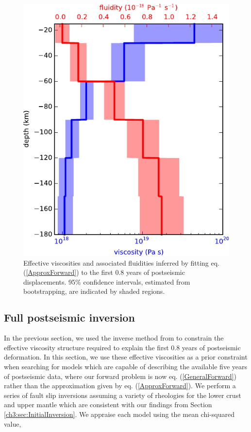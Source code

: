 \begin{figure}
\includegraphics[scale=1.0]{ch3/figures/2016jb013114-p12}
\centering 
\caption{Effective viscosities and associated fluidities inferred by fitting eq. (\ref{ApproxForward}) to the first 0.8 years of postseismic displacements. 95\% confidence intervals, estimated from bootstrapping, are indicated by shaded regions.}
\label{ch3:fig:EffectiveViscosity}
\end{figure} 

\subsection{Full postseismic inversion}\label{ch3:sec:FullInversion} 
In the previous section, we used the inverse method from \citet{Hines2016} to constrain the effective viscosity structure required to explain the first 0.8 years of postseismic deformation. In this section, we use these effective viscosities as a prior constraint when searching for models which are capable of describing the available five years of postseismic data, where our forward problem is now eq. (\ref{GeneralForward}) rather than the approximation given by eq. (\ref{ApproxForward}).  We perform a series of fault slip inversions assuming a variety of rheologies for the lower crust and upper mantle which are consistent with our findings from Section \ref{ch3:sec:InitialInversion}.  We appraise each model using the mean chi-squared value,

